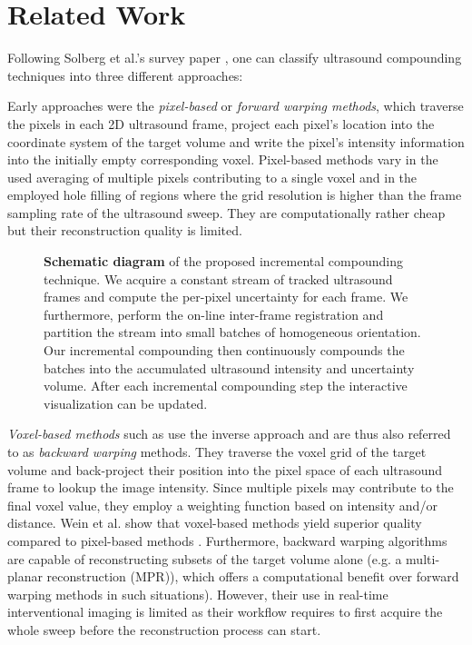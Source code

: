 \section{Related Work}

Following Solberg et al.'s survey paper \cite{Solberg07}, one can classify ultrasound compounding techniques into three different approaches:

Early approaches were the \emph{pixel-based} or \emph{forward warping methods}, which traverse the pixels in each 2D ultrasound frame, project each pixel's location into the coordinate system of the target volume and write the pixel's intensity information into the initially empty corresponding voxel.
Pixel-based methods vary in the used averaging of multiple pixels contributing to a single voxel and in the employed hole filling of regions where the grid resolution is higher than the frame sampling rate of the ultrasound sweep.
They are computationally rather cheap but their reconstruction quality is limited.

\begin{figure}[ht]
	\centering
	
	\caption{
		\textbf{Schematic diagram} of the proposed incremental compounding technique.
		We acquire a constant stream of tracked ultrasound frames and compute the per-pixel uncertainty for each frame.
		We furthermore, perform the on-line inter-frame registration and partition the stream into small batches of homogeneous orientation.
		Our incremental compounding then continuously compounds the batches into the accumulated ultrasound intensity and uncertainty volume.
		After each incremental compounding step the interactive visualization can be updated.
	}
	\label{fig:uscompounding:schematic-diagram}
\end{figure}

\emph{Voxel-based methods} such as \cite{Coupe05,Wein06} use the inverse approach and are thus also referred to as \emph{backward warping} methods.
They traverse the voxel grid of the target volume and back-project their position into the pixel space of each ultrasound frame to lookup the image intensity.
Since multiple pixels may contribute to the final voxel value, they employ a weighting function based on intensity and/or distance.
Wein et al. show that voxel-based methods yield superior quality compared to pixel-based methods \cite{Wein06}.
Furthermore, backward warping algorithms are capable of reconstructing subsets of the target volume alone (e.g. a multi-planar reconstruction (MPR)), which offers a computational benefit over forward warping methods in such situations).
However, their use in real-time interventional imaging is limited as their workflow requires to first acquire the whole sweep before the reconstruction process can start.

